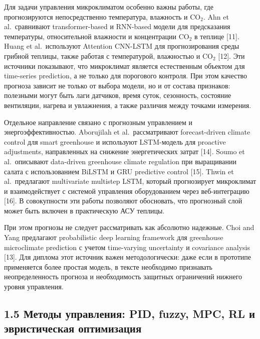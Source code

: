 \documentclass[a4paper,14pt]{extarticle}
\begin{document}
Для задачи управления микроклиматом особенно важны работы, где
прогнозируются непосредственно температура, влажность и CO\(_2\). Ahn et
al.~сравнивают transformer-based и RNN-based модели для предсказания
температуры, относительной влажности и концентрации CO\(_2\) в теплице
{[}11{]}. Huang et al.~используют Attention CNN-LSTM для прогнозирования
среды грибной теплицы, также работая с температурой, влажностью и
CO\(_2\) {[}12{]}. Эти источники показывают, что микроклимат является
естественным объектом для time-series prediction, а не только для
порогового контроля. При этом качество прогноза зависит не только от
выбора модели, но и от состава признаков: полезными могут быть лаги
датчиков, время суток, сезонность, состояние вентиляции, нагрева и
увлажнения, а также различия между точками измерения.

Отдельное направление связано с прогнозным управлением и
энергоэффективностью. Aborujilah et al.~рассматривают forecast-driven
climate control для smart greenhouse и используют LSTM-модель для
proactive adjustments, направленных на снижение энергетических затрат
{[}14{]}. Soumo et al.~описывают data-driven greenhouse climate
regulation при выращивании салата с использованием BiLSTM и GRU
predictive control {[}15{]}. Thwin et al.~предлагают multivariate
multistep LSTM, который прогнозирует микроклимат и взаимодействует с
системой управления оборудованием через веб-интеграцию {[}16{]}. В
совокупности эти работы позволяют обосновать, что прогнозный слой может
быть включен в практическую АСУ теплицы.

При этом прогнозы не следует рассматривать как абсолютно надежные. Choi
and Yang предлагают probabilistic deep learning framework для greenhouse
microclimate prediction с учетом time-varying uncertainty и covariance
analysis {[}13{]}. Для диплома этот источник важен методологически: даже
если в прототипе применяется более простая модель, в тексте необходимо
признавать неопределенность прогноза и необходимость защитных
ограничений нижнего уровня управления.

\subsection{1.5 Методы управления: PID, fuzzy, MPC, RL и эвристическая
оптимизация}\label{ux43cux435ux442ux43eux434ux44b-ux443ux43fux440ux430ux432ux43bux435ux43dux438ux44f-pid-fuzzy-mpc-rl-ux438-ux44dux432ux440ux438ux441ux442ux438ux447ux435ux441ux43aux430ux44f-ux43eux43fux442ux438ux43cux438ux437ux430ux446ux438ux44f}
\end{document}
